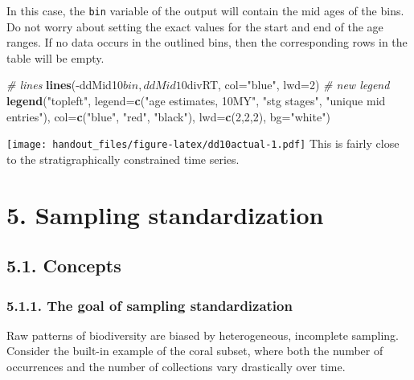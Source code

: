\documentclass[]{article}
\newenvironment{Shaded}{\begin{snugshade}}{\end{snugshade}}
\newcommand{\KeywordTok}[1]{\textcolor[rgb]{0.13,0.29,0.53}{\textbf{{#1}}}}
\newcommand{\DataTypeTok}[1]{\textcolor[rgb]{0.13,0.29,0.53}{{#1}}}
\newcommand{\DecValTok}[1]{\textcolor[rgb]{0.00,0.00,0.81}{{#1}}}
\newcommand{\StringTok}[1]{\textcolor[rgb]{0.31,0.60,0.02}{{#1}}}
\newcommand{\CommentTok}[1]{\textcolor[rgb]{0.56,0.35,0.01}{\textit{{#1}}}}
\newcommand{\NormalTok}[1]{{#1}}
\begin{document}
In this case, the \texttt{bin} variable of the output will contain the
mid ages of the bins. Do not worry about setting the exact values for
the start and end of the age ranges. If no data occurs in the outlined
bins, then the corresponding rows in the table will be empty.

\begin{Shaded}
\begin{Highlighting}[]
\CommentTok{# lines  }
\KeywordTok{lines}\NormalTok{(-ddMid10$bin, ddMid10$divRT, }\DataTypeTok{col=}\StringTok{"blue"}\NormalTok{, }\DataTypeTok{lwd=}\DecValTok{2}\NormalTok{)}
\CommentTok{# new legend}
\KeywordTok{legend}\NormalTok{(}\StringTok{"topleft"}\NormalTok{, }\DataTypeTok{legend=}\KeywordTok{c}\NormalTok{(}\StringTok{"age estimates, 10MY"}\NormalTok{,  }
  \StringTok{"stg stages"}\NormalTok{, }\StringTok{"unique mid entries"}\NormalTok{), }\DataTypeTok{col=}\KeywordTok{c}\NormalTok{(}\StringTok{"blue"}\NormalTok{, }\StringTok{"red"}\NormalTok{, }\StringTok{"black"}\NormalTok{),}
  \DataTypeTok{lwd=}\KeywordTok{c}\NormalTok{(}\DecValTok{2}\NormalTok{,}\DecValTok{2}\NormalTok{,}\DecValTok{2}\NormalTok{), }\DataTypeTok{bg=}\StringTok{"white"}\NormalTok{)}
\end{Highlighting}
\end{Shaded}

\texttt{[image: handout\_files/figure-latex/dd10actual-1.pdf]} This is
fairly close to the stratigraphically constrained time series.

\section{5. Sampling standardization}\label{sampling-standardization}

\subsection{5.1. Concepts}\label{concepts}

\subsubsection{5.1.1. The goal of sampling
standardization}\label{the-goal-of-sampling-standardization}

Raw patterns of biodiversity are biased by heterogeneous, incomplete
sampling. Consider the built-in example of the coral subset, where both
the number of occurrences and the number of collections vary drastically
over time.
\end{document}
